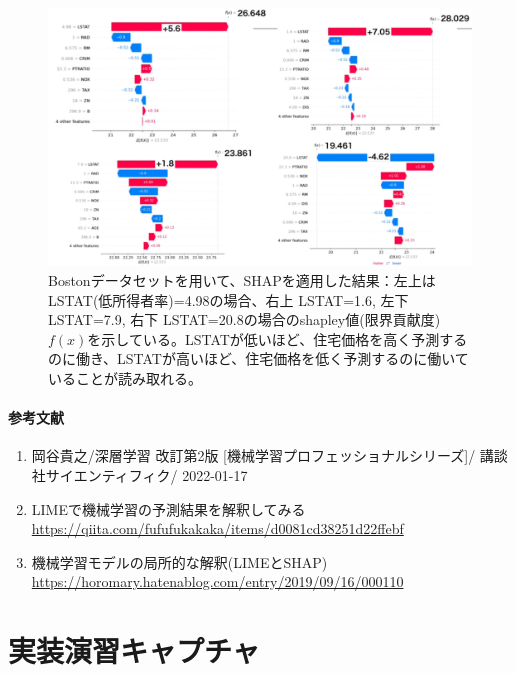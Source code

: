 \documentclass{ltjsarticle}
\begin{document}
\begin{figure}
  \centering
  \includegraphics[width=14cm]{./capture/SHAP_Boston_dataset.png}
  \caption{Bostonデータセットを用いて、SHAPを適用した結果：左上はLSTAT(低所得者率)=4.98の場合、右上 LSTAT=1.6, 左下 LSTAT=7.9, 右下 LSTAT=20.8の場合のshapley値(限界貢献度)$f(x)$を示している。LSTATが低いほど、住宅価格を高く予測するのに働き、LSTATが高いほど、住宅価格を低く予測するのに働いていることが読み取れる。}
  \label{fig:SHAP_example}
\end{figure}

\clearpage
\paragraph{参考文献}
\begin{enumerate}
  \item 岡谷貴之/深層学習 改訂第2版 [機械学習プロフェッショナルシリーズ]/ 講談社サイエンティフィク/ 2022-01-17
  \item LIMEで機械学習の予測結果を解釈してみる \url{https://qiita.com/fufufukakaka/items/d0081cd38251d22ffebf}
  \item 機械学習モデルの局所的な解釈(LIMEとSHAP) \url{https://horomary.hatenablog.com/entry/2019/09/16/000110}
\end{enumerate}

\clearpage
\section{実装演習キャプチャ}
\end{document}
